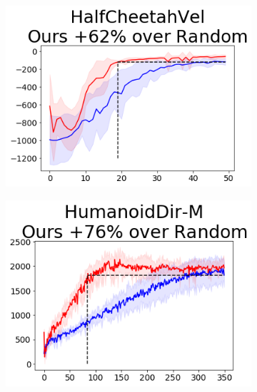 \begin{figure}[t]
{        \begin{subfigure}{0.125\paperwidth}
            \includegraphics[width=\linewidth]{chapter_2/fig/init-sac-vs-train-HalfCheetahVel.png}
        \end{subfigure}

        \begin{subfigure}{0.125\paperwidth}
            \includegraphics[width=\linewidth]{chapter_2/fig/init-sac-vs-train-HumanoidDir-M.png}
        \end{subfigure}

}
\end{figure}
